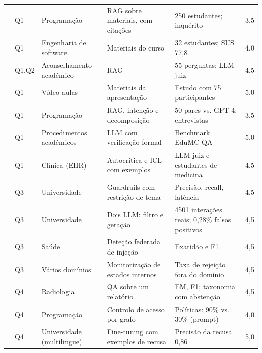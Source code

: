 {\begin{longtable}{p{2.6cm} p{0.95cm} p{2.3cm} p{3.0cm} p{2.95cm} p{0.5cm}}
\textcite{seshadri2026alan} & Q1 & Programação & RAG sobre materiais, com citações & 250 estudantes; inquérito & 3,5 \\
\textcite{barzanji2026buddy} & Q1 & Engenharia de software & Materiais do curso & 32 estudantes; SUS 77,8 & 4,0 \\
\textcite{buti2026evaluating} & Q1,Q2 & Aconselhamento académico & RAG & 55 perguntas; LLM juiz & 4,5 \\
\textcite{xu2026echomind} & Q1 & Vídeo-aulas & Materiais da apresentação & Estudo com 75 participantes & 5,0 \\
\textcite{feng2024courseassist} & Q1 & Programação & RAG, intenção e decomposição & 50 pares vs. GPT-4; entrevistas & 3,5 \\
\textcite{bui2025formal} & Q1 & Procedimentos académicos & LLM com verificação formal & Benchmark EduMC-QA & 5,0 \\
\textcite{liao2026heal} & Q1 & Clínica (EHR) & Autocrítica e ICL com exemplos & LLM juiz e estudantes de medicina & 4,5 \\
\textcite{walczak2026comparative} & Q3 & Universidade & Guardrails com restrição de tema & Precisão, recall, latência & 4,5 \\
\textcite{emekci2025securing} & Q3 & Universidade & Dois LLM: filtro e geração & 4501 interações reais; 0,28\% falsos positivos & 4,5 \\
\textcite{mathew2026privacy} & Q3 & Saúde & Deteção federada de injeção & Exatidão e F1 & 4,5 \\
\textcite{li2026responsible} & Q3 & Vários domínios & Monitorização de estados internos & Taxa de rejeição fora do domínio & 4,5 \\
\textcite{hamidi2026large} & Q4 & Radiologia & QA sobre um relatório & EM, F1; taxonomia com abstenção & 4,5 \\
\textcite{rayhan2026sage} & Q4 & Programação & Controlo de acesso por grafo & Políticas: 90\% vs. 30\% (prompt) & 4,0 \\
\textcite{abrar2025domain} & Q4 & Universidade (multilingue) & Fine-tuning com exemplos de recusa & Precisão da recusa 0,86 & 5,0 \\
\end{longtable}
}
